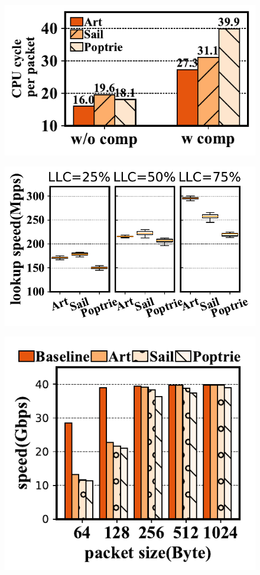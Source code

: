 \documentclass[a4paper]{article}
\begin{document}
    \begin{figure}[htbp]
        \includegraphics{../result/example4.pdf}
    \end{figure}

    \begin{figure}[htbp]
        \includegraphics{../result/example5.pdf}
    \end{figure}

    \begin{figure}[htbp]
        \includegraphics{../result/example6.pdf}
    \end{figure}
\end{document}
